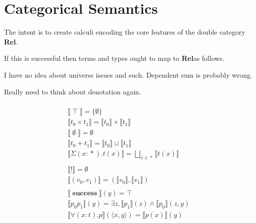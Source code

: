 \documentclass[twocolumn]{scrartcl}
\newcommand{\Rel}{\textbf{Rel}}
\DeclareMathOperator{\unit}{\top}
\DeclareMathOperator{\mt}{\emptyset}
\DeclareMathOperator{\coin}{\textbf{!}}
\DeclareMathOperator{\success}{\textbf{success}}
\DeclareMathOperator{\prop}{*}
\begin{document}
\section*{Categorical Semantics}

The intent is to create calculi encoding the core features of the
double category \Rel.

If this is successful then terms and types ought to map to \Rel as
follows.

\begin{center}
\end{center}

I have no idea about universe issues and such. Dependent sum is probably wrong.

Really need to think about denotation again.

\begin{multline*}
  \\
  \llbracket \unit \rrbracket = \{ \emptyset \} \\
  \llbracket t_0 \times t_1 \rrbracket = \llbracket t_0 \rrbracket \times \llbracket t_1 \rrbracket \\
  \llbracket \mt \rrbracket = \emptyset \\
  \llbracket t_0 + t_1 \rrbracket = \llbracket t_0 \rrbracket \sqcup \llbracket t_1 \rrbracket \\
  \llbracket \Sigma (x \colon \prop). t(x) \rrbracket = \bigsqcup_{ x \in \prop} \llbracket t(x) \rrbracket \\
  \\
  \llbracket \coin \rrbracket = \emptyset \\
  \llbracket ( v_0 , v_1 ) \rrbracket = ( \llbracket v_0 \rrbracket , \llbracket v_1 \rrbracket ) \\
  \\
  \llbracket \success \rrbracket(y) = \top \\
  \llbracket p_0 p_1 \rrbracket(y) = \exists z,  \llbracket p_1 \rrbracket (z) \wedge \llbracket p_0 \rrbracket (z, y)\\
  \llbracket \forall (x \colon t). p \rrbracket(\langle x, y \rangle) = \llbracket p(x) \rrbracket (y)  \\
\end{multline*}
\end{document}
